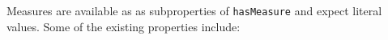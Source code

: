 \documentclass[]{interact}
\theoremstyle{plain}%
\theoremstyle{definition}
\theoremstyle{remark}
\theoremstyle{definition}
\begin{document}


%
%
%
%



%
%
%
%
%
%
%
%

Measures are available as as subproperties of \texttt{hasMeasure} and expect literal values. Some of the existing properties include:
\end{document}
